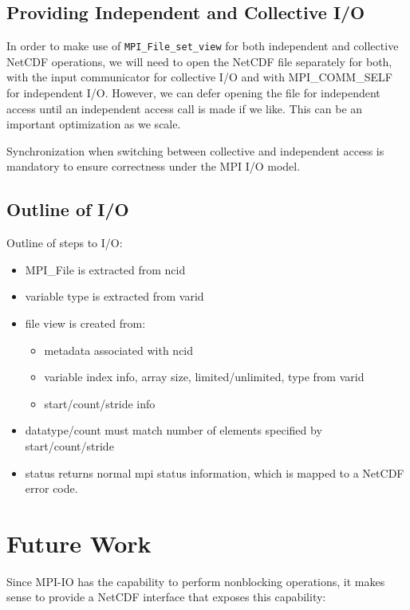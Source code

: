 \documentclass[10pt]{article}
\begin{document}
\subsection{Providing Independent and Collective I/O}
In order to make use of \texttt{MPI\_File\_set\_view} for both independent and
collective NetCDF operations, we will need to open the NetCDF file separately
for both, with the input communicator for collective I/O and with
MPI\_COMM\_SELF for independent I/O.  However, we can defer opening the file
for independent access until an independent access call is made if we like.
This can be an important optimization as we scale.

Synchronization when switching between collective and independent access is
mandatory to ensure correctness under the MPI I/O model.

\subsection{Outline of I/O}

Outline of steps to I/O:
\begin{itemize}
\item MPI\_File is extracted from ncid
\item variable type is extracted from varid
\item file view is created from:
  \begin{itemize}
  \item metadata associated with ncid
  \item variable index info, array size, limited/unlimited, type from varid
  \item start/count/stride info
  \end{itemize}
\item datatype/count must match number of elements specified by
  start/count/stride
\item status returns normal mpi status information, which is mapped to a
  NetCDF error code.
\end{itemize}


\section{Future Work}

Since MPI-IO has the capability to perform nonblocking operations, it makes
sense to provide a NetCDF interface that exposes this capability:
\end{document}
